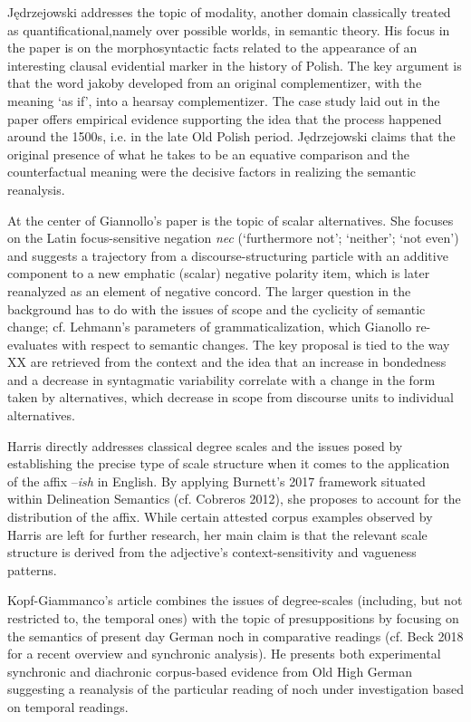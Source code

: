 \documentclass[output=paper]{langsci/langscibook}
\begin{document}
Jędrzejowski addresses the topic of modality, another domain classically\linebreak 
treated as quantificational,namely over possible worlds, in semantic theory. His focus in the paper is on the morphosyntactic facts related to the appearance of an interesting clausal evidential marker in the history of Polish.  The key argument is that the word jakoby developed from an original complementizer, with the meaning ‘as if’, into a hearsay complementizer. The case study laid out in the paper offers empirical evidence supporting the idea that the process happened around the 1500s, i.e. in the late Old Polish period. Jędrzejowski claims that the original presence of what he takes to be an equative comparison and the counterfactual meaning were the decisive factors in realizing the semantic reanalysis.

At the center of Giannollo’s paper is the topic of scalar alternatives. She focuses on the Latin focus-sensitive negation \textit{nec} (`furthermore not'; `neither'; `not even') and suggests a trajectory from a discourse-structuring particle with an additive component to a new emphatic (scalar) negative polarity item, which is later reanalyzed as an element of negative concord. The larger question in the background has to do with the issues of scope and the cyclicity of semantic change; cf. Lehmann’s parameters of grammaticalization, which Gianollo re-evaluates with respect to semantic changes. The key proposal is tied to the way XX are retrieved from the context and the idea that an increase in bondedness and a decrease in syntagmatic variability correlate with a change in the form taken by alternatives, which decrease in scope from discourse units to individual alternatives.

Harris directly addresses classical degree scales and the issues posed by establishing the precise type of scale structure when it comes to the application of the affix –\textit{ish} in English. By applying Burnett’s 2017 framework situated within Delineation Semantics (cf. Cobreros 2012), she proposes to account for the distribution of the affix. While certain attested corpus examples observed by Harris are left for further research, her main claim is that the relevant scale structure is derived from the adjective’s context-sensitivity and vagueness patterns.

Kopf-Giammanco’s article combines the issues of degree-scales (including, but not restricted to, the temporal ones) with the topic of presuppositions by focusing on the semantics of present day German noch in comparative readings (cf. Beck 2018 for a recent overview and synchronic analysis). He presents both experimental synchronic and diachronic corpus-based evidence from Old High German suggesting a reanalysis of the particular reading of noch under investigation based on temporal readings.
\end{document}
